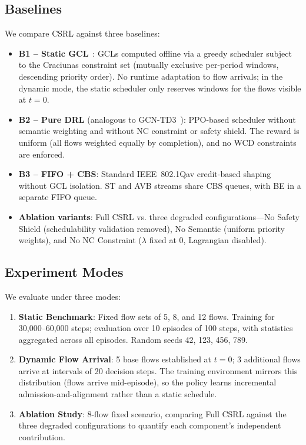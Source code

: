 \documentclass[conference]{IEEEtran}
\begin{document}
\subsection{Baselines}

We compare CSRL against three baselines:
\begin{itemize}
\item \textbf{B1 -- Static GCL}~\cite{craciunas2016smt}: GCLs computed offline via a greedy scheduler subject to the Craciunas constraint set (mutually exclusive per-period windows, descending priority order). No runtime adaptation to flow arrivals; in the dynamic mode, the static scheduler only reserves windows for the flows visible at $t=0$.
\item \textbf{B2 -- Pure DRL} (analogous to GCN-TD3~\cite{islam2024gcntd3}): PPO-based scheduler without semantic weighting and without NC constraint or safety shield. The reward is uniform (all flows weighted equally by completion), and no WCD constraints are enforced.
\item \textbf{B3 -- FIFO + CBS}: Standard IEEE~802.1Qav credit-based shaping without GCL isolation. ST and AVB streams share CBS queues, with BE in a separate FIFO queue.
\item \textbf{Ablation variants}: Full CSRL vs. three degraded configurations---No Safety Shield (schedulability validation removed), No Semantic (uniform priority weights), and No NC Constraint ($\lambda$ fixed at 0, Lagrangian disabled).
\end{itemize}

\subsection{Experiment Modes}

We evaluate under three modes:
\begin{enumerate}
\item \textbf{Static Benchmark}: Fixed flow sets of 5, 8, and 12 flows. Training for 30,000--60,000 steps; evaluation over 10 episodes of 100 steps, with statistics aggregated across all episodes. Random seeds 42, 123, 456, 789.
\item \textbf{Dynamic Flow Arrival}: 5 base flows established at $t=0$; 3 additional flows arrive at intervals of 20 decision steps. The training environment mirrors this distribution (flows arrive mid-episode), so the policy learns incremental admission-and-alignment rather than a static schedule.
\item \textbf{Ablation Study}: 8-flow fixed scenario, comparing Full CSRL against the three degraded configurations to quantify each component's independent contribution.
\end{enumerate}
\end{document}
